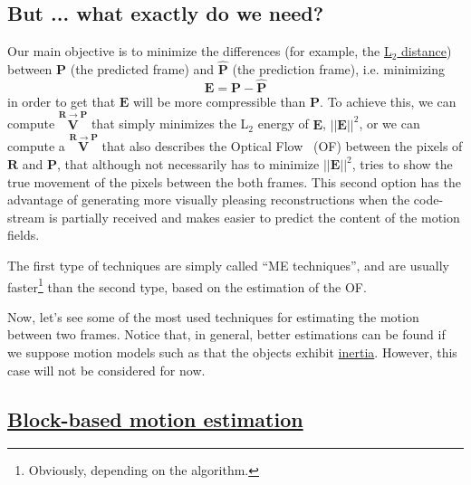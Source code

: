 \subsection{But ... what exactly do we need?}
Our main objective is to minimize the differences (for example, the
\href{https://en.wikipedia.org/wiki/Euclidean_distance}{L$_2$
  distance}) between ${\mathbf P}$ (the predicted frame) and $\hat{\mathbf P}$ (the
prediction frame), i.e. minimizing
\begin{equation}
  {\mathbf E} = {\mathbf P} - \hat{\mathbf P}
\end{equation}
in order to get that ${\mathbf E}$ will be more compressible than
${\mathbf P}$. To achieve this, we can compute $\overset{{\mathbf
    R}\rightarrow {\mathbf P}}{\mathbf V}$ that simply minimizes the
L$_2$ energy of ${\mathbf E}$, $||{\mathbf E}||^2$, or we can compute
a $\overset{{\mathbf R}\rightarrow {\mathbf P}}{\mathbf V}$ that also describes the Optical
Flow~\cite{horn1981determining} (OF) between the pixels of ${\mathbf
  R}$ and ${\mathbf P}$, that although not necessarily has to
minimize $||{\mathbf E}||^2$, tries to show the true movement of the
pixels between the both frames. This second option has the advantage
of generating more visually pleasing reconstructions when the
code-stream is partially received and makes easier to predict the
content of the motion fields.

The first type of techniques are simply called ``ME techniques'', and
are usually faster\footnote{Obviously, depending on the algorithm.}
than the second type, based on the estimation of the OF.


Now, let's see some of the most used techniques for estimating the
motion between two frames. Notice that, in general, better estimations
can be found if we suppose motion models such as that the objects
exhibit
\href{https://en.wikipedia.org/wiki/Inertia}{inertia}. However, this
case will not be considered for now.

\subsection{\href{https://vicente-gonzalez-ruiz.github.io/video_compression/\#x1-40003}{Block-based motion estimation}}

